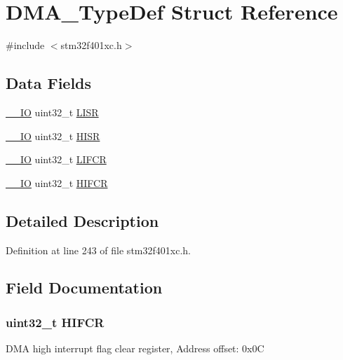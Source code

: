 \hypertarget{struct_d_m_a___type_def}{}\section{D\+M\+A\+\_\+\+Type\+Def Struct Reference}
\label{struct_d_m_a___type_def}


{\ttfamily \#include $<$stm32f401xc.\+h$>$}

\subsection*{Data Fields}
\begin{DoxyCompactItemize}
\item 
\hyperlink{core__sc300_8h_aec43007d9998a0a0e01faede4133d6be}{\+\_\+\+\_\+\+IO} uint32\+\_\+t \hyperlink{struct_d_m_a___type_def_a5cdef358e9e95b570358e1f6a3a7f492}{L\+I\+SR}
\item 
\hyperlink{core__sc300_8h_aec43007d9998a0a0e01faede4133d6be}{\+\_\+\+\_\+\+IO} uint32\+\_\+t \hyperlink{struct_d_m_a___type_def_a6fe40f7ac1a18c2726b328b5ec02b262}{H\+I\+SR}
\item 
\hyperlink{core__sc300_8h_aec43007d9998a0a0e01faede4133d6be}{\+\_\+\+\_\+\+IO} uint32\+\_\+t \hyperlink{struct_d_m_a___type_def_ac4f7bf4cb172024bfc940c00167cd04e}{L\+I\+F\+CR}
\item 
\hyperlink{core__sc300_8h_aec43007d9998a0a0e01faede4133d6be}{\+\_\+\+\_\+\+IO} uint32\+\_\+t \hyperlink{struct_d_m_a___type_def_ac55c27aeea4107813c1e7da3fcf46961}{H\+I\+F\+CR}
\end{DoxyCompactItemize}


\subsection{Detailed Description}


Definition at line 243 of file stm32f401xc.\+h.



\subsection{Field Documentation}
\subsubsection[{\texorpdfstring{H\+I\+F\+CR}{HIFCR}}]{ uint32\+\_\+t H\+I\+F\+CR}\hypertarget{struct_d_m_a___type_def_ac55c27aeea4107813c1e7da3fcf46961}{}\label{struct_d_m_a___type_def_ac55c27aeea4107813c1e7da3fcf46961}
D\+MA high interrupt flag clear register, Address offset\+: 0x0C 

